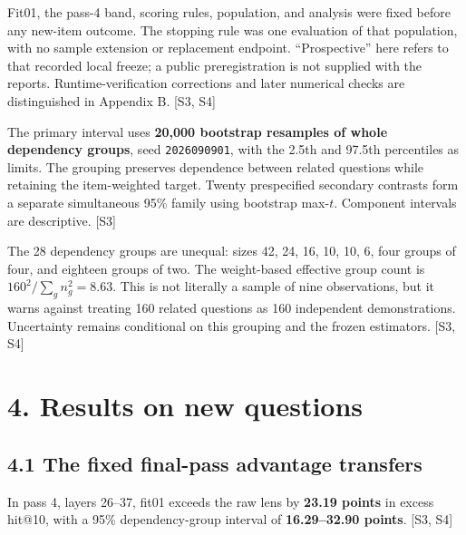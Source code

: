 \documentclass[
  11pt,
  a4paper,
]{article}
\begin{document}
Fit01, the pass-4 band, scoring rules, population, and analysis were
fixed before any new-item outcome. The stopping rule was one evaluation
of that population, with no sample extension or replacement endpoint.
``Prospective'' here refers to that recorded local freeze; a public
preregistration is not supplied with the reports. Runtime-verification
corrections and later numerical checks are distinguished in Appendix B.
{[}S3, S4{]}

The primary interval uses \textbf{20,000 bootstrap resamples of whole
dependency groups}, seed \texttt{2026090901}, with the 2.5th and 97.5th
percentiles as limits. The grouping preserves dependence between related
questions while retaining the item-weighted target. Twenty prespecified
secondary contrasts form a separate simultaneous 95\% family using
bootstrap max-\(t\). Component intervals are descriptive. {[}S3{]}

The 28 dependency groups are unequal: sizes 42, 24, 16, 10, 10, 6, four
groups of four, and eighteen groups of two. The weight-based effective
group count is \(160^2/\sum_g n_g^2=8.63\). This is not literally a
sample of nine observations, but it warns against treating 160 related
questions as 160 independent demonstrations. Uncertainty remains
conditional on this grouping and the frozen estimators. {[}S3, S4{]}

\section{4. Results on new questions}\label{results-on-new-questions}

\subsection{4.1 The fixed final-pass advantage
transfers}\label{the-fixed-final-pass-advantage-transfers}

In pass 4, layers 26--37, fit01 exceeds the raw lens by \textbf{23.19
points} in excess hit@10, with a 95\% dependency-group interval of
\textbf{16.29--32.90 points}. {[}S3, S4{]}
\end{document}
